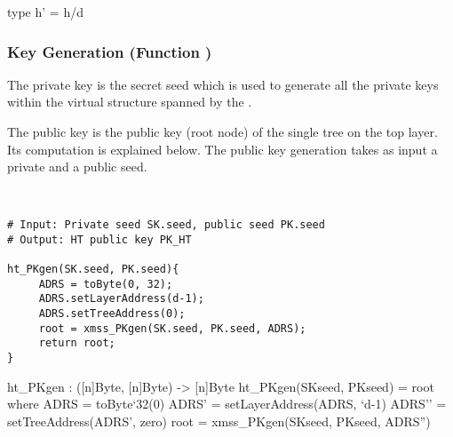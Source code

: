 \begin{code}
  type h' = h/d
\end{code}


\subsubsection{\hyper Key Generation (Function \htpkgen)}

   The \hyper private key is the secret seed \sseed which is used to generate 
   all the \wotsp private keys within the virtual structure spanned by the \hyper. 

   The \hyper public key is the public key (root node) of the single \xmss tree on 
   the top layer. Its computation is explained below. The public key generation
   takes as input a private and a public seed.

   \begin{lstlisting}[label=alg:xmssmt:pkgen, language=pseudoc,
                   caption=\htpkgen\ -- Generating an HT public key.]


# Input: Private seed SK.seed, public seed PK.seed
# Output: HT public key PK_HT

ht_PKgen(SK.seed, PK.seed){          
     ADRS = toByte(0, 32);
     ADRS.setLayerAddress(d-1);
     ADRS.setTreeAddress(0);
     root = xmss_PKgen(SK.seed, PK.seed, ADRS);
     return root;
}

\end{lstlisting}

\begin{code}
  ht_PKgen : ([n]Byte, [n]Byte) -> [n]Byte
  ht_PKgen(SKseed, PKseed) = root where
    ADRS = toByte`{32}(0)
    ADRS' = setLayerAddress(ADRS, `d-1)
    ADRS'' = setTreeAddress(ADRS', zero)
    root = xmss_PKgen(SKseed, PKseed, ADRS'')
\end{code}

% 

